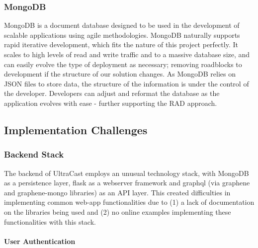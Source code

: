 \documentclass[../report.tex]{subfiles}
\begin{document}
\subsubsection{MongoDB}
MongoDB is a document database designed to be used in the development of scalable applications using agile methodologies. MongoDB naturally supports rapid iterative development, which fits the nature of this project perfectly. It scales to high levels of read and write traffic and to a massive database size, and can easily evolve the type of deployment as necessary; removing roadblocks to development if the structure of our solution changes. As MongoDB relies on JSON files to store data, the structure of the information is under the control of the developer. Developers can adjust and reformat the database as the application evolves with ease - further supporting the RAD approach.


\iffalse
    \subsection{Implementation Challenges}

    \subsubsection{Backend Stack} \label{sssec:backend_challenges}

    The backend of UltraCast employs an unusual technology stack, with MongoDB as a persistence layer, flask as a webserver framework and graphql (via graphene and graphene-mongo libraries) as an API layer.
    This created difficulties in implementing common web-app functionalities due to (1) a lack of documentation on the libraries being used and (2) no online examples implementing these functionalities with this stack.

    \paragraph{User Authentication}
\end{document}
